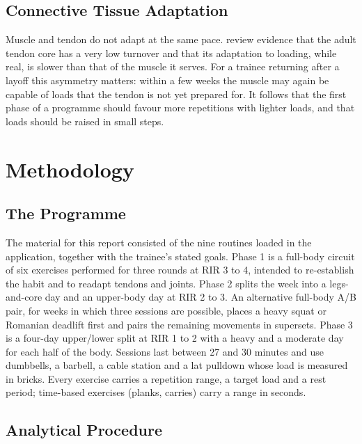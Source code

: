 \documentclass[11pt,a4paper]{article}
\begin{document}
\subsection*{Connective Tissue Adaptation}

Muscle and tendon do not adapt at the same pace. \citet{magnusson2019} review evidence that the adult tendon core has a very low turnover and that its adaptation to loading, while real, is slower than that of the muscle it serves. For a trainee returning after a layoff this asymmetry matters: within a few weeks the muscle may again be capable of loads that the tendon is not yet prepared for. It follows that the first phase of a programme should favour more repetitions with lighter loads, and that loads should be raised in small steps.

\section*{Methodology}

\subsection*{The Programme}

The material for this report consisted of the nine routines loaded in the application, together with the trainee's stated goals. Phase 1 is a full-body circuit of six exercises performed for three rounds at RIR 3 to 4, intended to re-establish the habit and to readapt tendons and joints. Phase 2 splits the week into a legs-and-core day and an upper-body day at RIR 2 to 3. An alternative full-body A/B pair, for weeks in which three sessions are possible, places a heavy squat or Romanian deadlift first and pairs the remaining movements in supersets. Phase 3 is a four-day upper/lower split at RIR 1 to 2 with a heavy and a moderate day for each half of the body. Sessions last between 27 and 30 minutes and use dumbbells, a barbell, a cable station and a lat pulldown whose load is measured in bricks. Every exercise carries a repetition range, a target load and a rest period; time-based exercises (planks, carries) carry a range in seconds.

\subsection*{Analytical Procedure}
\end{document}
